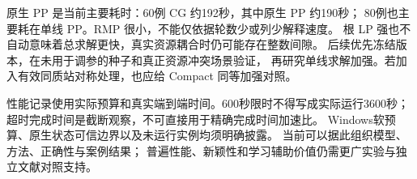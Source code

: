 \documentclass[UTF8,a4paper,11pt]{ctexart}
\begin{document}
原生 PP 是当前主要耗时：60例 CG 约192秒，其中原生 PP 约190秒；
80例也主要耗在单线 PP。RMP 很小，不能仅依据轮数少或列少解释速度。
根 LP 强也不自动意味着总求解更快，真实资源耦合时仍可能存在整数间隙。
后续优先冻结版本，在未用于调参的种子和真正资源冲突场景验证，
再研究单线求解加强。若加入有效同质站对称处理，也应给 Compact 同等加强对照。

性能记录使用实际预算和真实端到端时间。600秒限时不得写成实际运行3600秒；
超时完成时间是截断观察，不可直接用于精确完成时间加速比。
Windows软预算、原生状态可信边界以及未运行实例均须明确披露。
当前可以据此组织模型、方法、正确性与案例结果；
普遍性能、新颖性和学习辅助价值仍需更广实验与独立文献对照支持。
\end{document}
